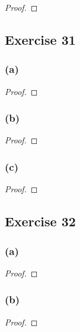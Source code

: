 \documentclass[14pt]{extarticle}
\begin{document}
\begin{proof}

\end{proof}

\subsection{Exercise 31}

\subsubsection{(a)}

\begin{proof}

\end{proof}

\subsubsection{(b)}

\begin{proof}

\end{proof}

\subsubsection{(c)}

\begin{proof}

\end{proof}

\subsection{Exercise 32}

\subsubsection{(a)}

\begin{proof}

\end{proof}

\subsubsection{(b)}

\begin{proof}

\end{proof}
\end{document}

